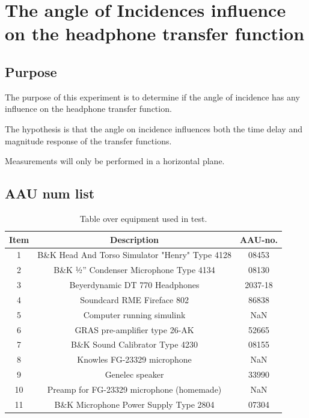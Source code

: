 
\section{The angle of Incidences influence on the headphone transfer function} \label{sec:AngleOfIncidence}

\subsection{Purpose}
The purpose of this experiment is to determine if the angle of incidence has any influence on the headphone transfer function. 

The hypothesis is that the angle on incidence influences both the time delay and magnitude response of the transfer functions.

Measurements will only be performed in a horizontal plane. 

\subsection{AAU num list}
\begin{table}[H]
	\centering
	\begin{tabular}{ c c c } \toprule
		{Item}	& {Description} 						& {AAU-no}. \\ \bottomrule 
		1	&	B\&K Head And Torso Simulator "Henry" Type 4128	& 08453	\\
		2	&	B\&K ½'' Condenser Microphone Type 4134 	& 08130		\\
		3	&	Beyerdynamic DT 770 Headphones				& 2037-18		\\
		4	&	Soundcard RME Fireface 802					& 86838		\\
		5	&	Computer running simulink		& NaN		\\
		6	&	GRAS pre-amplifier type 26-AK			& 52665		\\
		7	&	B\&K Sound Calibrator Type 4230				& 08155		\\ 
		8	&	Knowles FG-23329 microphone					& NaN		\\
		9	&	Genelec speaker								& 33990		\\ 
		10	&	Preamp for FG-23329  microphone	(homemade)	& NaN\\
		11	& 	B\&K Microphone Power Supply Type 2804		& 07304		\\
		\bottomrule
	\end{tabular}
	\caption{Table over equipment used in test.}
	\label{tab:AngleOfIncideceHP}
\end{table}

